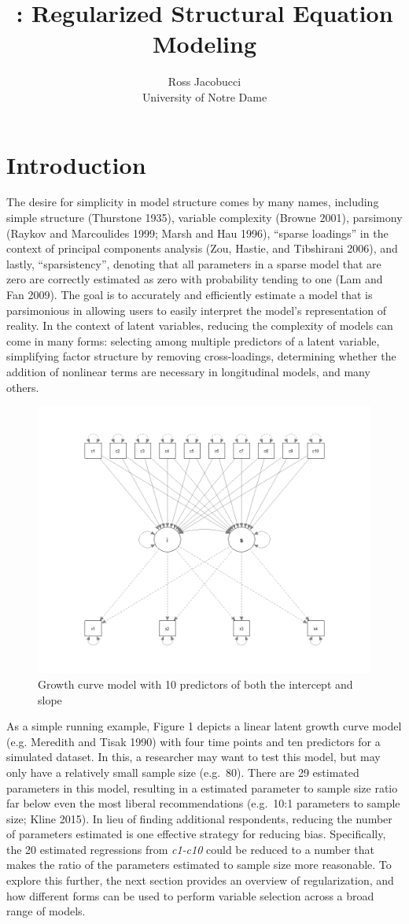 \documentclass[article]{jss}
\author{
Ross Jacobucci\\University of Notre Dame
}
\title{\pkg{regsem}: Regularized Structural Equation Modeling}
\begin{document}
\section{Introduction}\label{introduction}

The desire for simplicity in model structure comes by many names,
including simple structure (Thurstone 1935), variable complexity (Browne
2001), parsimony (Raykov and Marcoulides 1999; Marsh and Hau 1996),
``sparse loadings'' in the context of principal components analysis
(Zou, Hastie, and Tibshirani 2006), and lastly, ``sparsistency'',
denoting that all parameters in a sparse model that are zero are
correctly estimated as zero with probability tending to one (Lam and Fan
2009). The goal is to accurately and efficiently estimate a model that
is parsimonious in allowing users to easily interpret the model's
representation of reality. In the context of latent variables, reducing
the complexity of models can come in many forms: selecting among
multiple predictors of a latent variable, simplifying factor structure
by removing cross-loadings, determining whether the addition of
nonlinear terms are necessary in longitudinal models, and many others.

\begin{figure}
    \centering
    \includegraphics[width=.5\linewidth]{figs/growth_fig}
    \caption{Growth curve model with 10 predictors of both the intercept and slope}
\end{figure}

As a simple running example, Figure 1 depicts a linear latent growth
curve model (e.g. Meredith and Tisak 1990) with four time points and ten
predictors for a simulated dataset. In this, a researcher may want to
test this model, but may only have a relatively small sample size
(e.g.~80). There are 29 estimated parameters in this model, resulting in
a estimated parameter to sample size ratio far below even the most
liberal recommendations (e.g.~10:1 parameters to sample size; Kline
2015). In lieu of finding additional respondents, reducing the number of
parameters estimated is one effective strategy for reducing bias.
Specifically, the 20 estimated regressions from \textit{c1-c10} could be
reduced to a number that makes the ratio of the parameters estimated to
sample size more reasonable. To explore this further, the next section
provides an overview of regularization, and how different forms can be
used to perform variable selection across a broad range of models.
\end{document}
